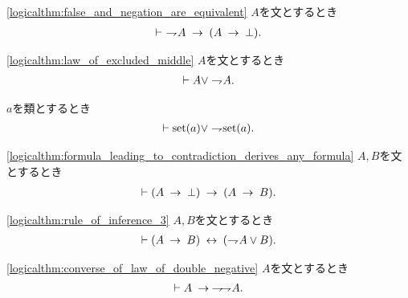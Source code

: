 	\begin{screen}
		\begin{logicalthm}[偽な式は矛盾を導く]
		\ref{logicalthm:false_and_negation_are_equivalent}
			$A$を文とするとき
			\begin{align}
				\vdash\ \rightharpoondown\hspace{-0.25em} A \hspace{0.25em}\rightarrow\hspace{0.25em} (A \hspace{0.25em}\rightarrow\hspace{0.25em} \bot).
			\end{align}
		\end{logicalthm}
	\end{screen}
	
	\begin{screen}
		\begin{logicalthm}[排中律]\ref{logicalthm:law_of_excluded_middle}
			$A$を文とするとき
			\begin{align}
				\vdash A \vee \rightharpoondown\hspace{-0.25em} A.
			\end{align}
		\end{logicalthm}
	\end{screen}
	
	\begin{screen}
		\begin{thm}[類は集合であるか真類であるかのいずれかに定まる]
			$a$を類とするとき
			\begin{align}
				\vdash \operatorname*{set} (a) \vee \rightharpoondown\hspace{-0.25em} \operatorname*{set} (a).
			\end{align}
		\end{thm}
	\end{screen}
	
	\begin{screen}
		\begin{logicalthm}[矛盾を導く式はあらゆる式を導く]
		\ref{logicalthm:formula_leading_to_contradiction_derives_any_formula}
			$A,B$を文とするとき
			\begin{align}
				\vdash (A \hspace{0.25em}\rightarrow\hspace{0.25em} \bot) \hspace{0.25em}\rightarrow\hspace{0.25em} (A \hspace{0.25em}\rightarrow\hspace{0.25em} B).
			\end{align}
		\end{logicalthm}
	\end{screen}
	
	\begin{screen}
		\begin{logicalthm}[含意は否定と論理和で表せる]
		\ref{logicalthm:rule_of_inference_3}
			$A,B$を文とするとき
			\begin{align}
				\vdash (A \hspace{0.25em}\rightarrow\hspace{0.25em} B) \hspace{0.25em}\leftrightarrow\hspace{0.25em} (\rightharpoondown\hspace{-0.25em} A \vee B).
			\end{align}
		\end{logicalthm}
	\end{screen}
	
	\begin{screen}
		\begin{logicalthm}[二重否定の法則の逆が成り立つ]
		\ref{logicalthm:converse_of_law_of_double_negative}
			$A$を文とするとき
			\begin{align}
				\vdash A \hspace{0.25em}\rightarrow\hspace{0.25em} \rightharpoondown\hspace{-0.25em} \rightharpoondown\hspace{-0.25em} A.
			\end{align}
		\end{logicalthm}
	\end{screen}
	

